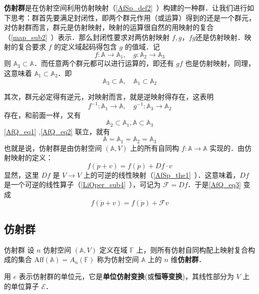 
\textbf{仿射群}是在仿射空间利用仿射映射（\autoref{AfSp_def2}~）构建的一种群．让我们进行如下思考：群首先要满足封闭性，即两个群元作用（或运算）得到的还是一个群元，对仿射群而言，群元是仿射映射，映射的运算很自然的用映射的复合（\autoref{map_sub2}~）表示．那么封闭性要求对两仿射映射 $f,g$，$fg$还是仿射映射．映射的复合要求 $f$ 的定义域起码得包含 $g$ 的值域．记
 \begin{equation}
f:\mathbb A\rightarrow\mathbb A_1,\quad g:\mathbb A_2\rightarrow \mathbb A_3
 \end{equation}
 则 $\mathbb A_3\subset \mathbb A$．而任意两个群元都可以进行运算的，即还有 $gf$ 也是仿射映射，同理，这意味着 $\mathbb A_1\subset\mathbb A_2$．即
 \begin{equation}\label{AfQ_eq1}
 \mathbb A_3\subset \mathbb A,\quad \mathbb A_1\subset\mathbb A_2
 \end{equation}
 
 其次，群元必定得有逆元，对映射而言，就是逆映射得存在，这表明
\begin{equation}
 f^{-1}:\mathbb A_1\rightarrow\mathbb A,\quad g^{-1}:\mathbb A_3\rightarrow\mathbb A_2
\end{equation}
 存在，和前面一样，又有
 \begin{equation}\label{AfQ_eq2}
 \mathbb A_2\subset \mathbb A_1, \mathbb A\subset\mathbb A_3
 \end{equation}
 \autoref{AfQ_eq1} ,\autoref{AfQ_eq2} 联立，就有
 \begin{equation}
 \mathbb A=\mathbb A_1= \mathbb A_2=\mathbb A_3
 \end{equation}
 也就是说，仿射群是由仿射空间 $(\mathbb A,V)$ 上的所有自同构 $f:\mathbb A\rightarrow\mathbb A$ 实现的．由仿射映射的定义：
 \begin{equation}\label{AfQ_eq3}
 f(\dot p+v)=f(\dot p)+Df\cdot v
 \end{equation}
 显然，这里 $Df$ 是 $V\rightarrow V$ 上的可逆的线性映射（\autoref{AfSp_the1}~）．这意味着，$Df$ 是一个可逆的线性算子（\autoref{LiOper_sub4}~），可记为 $\mathcal F=Df$．于是\autoref{AfQ_eq3} 变成
 \begin{equation}
 f(\dot p+v)=f(\dot p)+\mathcal F v
 \end{equation}
 \subsection{仿射群}
 \begin{definition}{仿射群}
 设 $n$ 仿射空间 $(\mathbb A,V)$ 定义在域 $\mathbb F$ 上，则所有仿射自同构配上映射复合构成的集合 $\mathrm{Aff}(\mathbb A)=A_n(\mathbb F)$ 称为仿射空间 $\mathbb A$ 上的 $n$ 维\textbf{仿射群}．
 \end{definition}
 用 $e$ 表示仿射群的单位元，它是\textbf{单位仿射变换}(或\textbf{恒等变换})，其线性部分为 $V$ 上的单位算子 $\mathcal E$．

